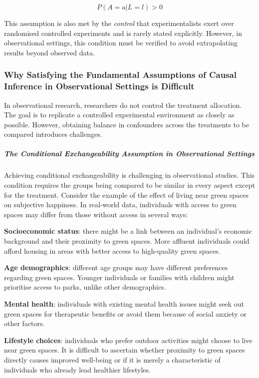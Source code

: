 \documentclass[
  singlecolumn]{article}
\let\oldsubparagraph\subparagraph
\renewcommand{\subparagraph}[1]{\oldsubparagraph{#1}\mbox{}}
\begin{document}
\[
P(A = a | L= l) > 0
\]

This assumption is also met by the \emph{control} that experimentalists
exert over randomised controlled experiments and is rarely stated
explicitly. However, in observational settings, this condition must be
verified to avoid extrapolating results beyond observed data.

\subsubsection{Why Satisfying the Fundamental Assumptions of Causal
Inference in Observational Settings is
Difficult}\label{why-satisfying-the-fundamental-assumptions-of-causal-inference-in-observational-settings-is-difficult}

In observational research, researchers do not control the treatment
allocation. The goal is to replicate a controlled experimental
environment as closely as possible. However, obtaining balance in
confounders across the treatments to be compared introduces challenges.

\subparagraph{The Conditional Exchangeability Assumption in
Observational
Settings}\label{the-conditional-exchangeability-assumption-in-observational-settings}

Achieving conditional exchangeability is challenging in observational
studies. This condition requires the groups being compared to be similar
in every aspect except for the treatment. Consider the example of the
effect of living near green spaces on subjective happiness. In
real-world data, individuals with access to green spaces may differ from
those without access in several ways:

\textbf{Socioeconomic status}: there might be a link between an
individual's economic background and their proximity to green spaces.
More affluent individuals could afford housing in areas with better
access to high-quality green spaces.

\textbf{Age demographics}: different age groups may have different
preferences regarding green spaces. Younger individuals or families with
children might prioritise access to parks, unlike other demographics.

\textbf{Mental health}: individuals with existing mental health issues
might seek out green spaces for therapeutic benefits or avoid them
because of social anxiety or other factors.

\textbf{Lifestyle choices}: individuals who prefer outdoor activities
might choose to live near green spaces. It is difficult to ascertain
whether proximity to green spaces directly causes improved well-being or
if it is merely a characteristic of individuals who already lead
healthier lifestyles.
\end{document}
